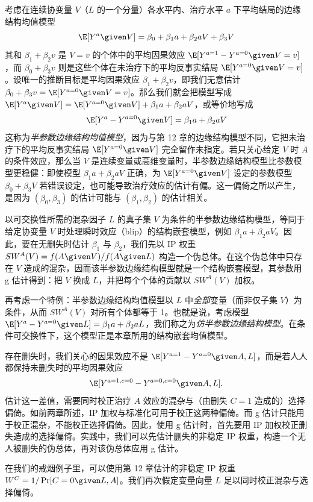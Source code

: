 \begin{finepoint}[边缘结构模型与结构嵌套模型的关系]
考虑在连续协变量 $V$（$L$ 的一个分量）各水平内、治疗水平 $a$ 下平均结局的边缘结构均值模型
\[
\E[Y^a\given V]=\beta_0+\beta_1a+\beta_2aV+\beta_3V
\]
其和 $\beta_1+\beta_2v$ 是 $V=v$ 的个体中的平均因果效应 $\E[Y^{a=1}-Y^{a=0}\given V=v]$，而 $\beta_0+\beta_3v$ 则是这些个体在未治疗下的平均反事实结局 $\E[Y^{a=0}\given V=v]$。设唯一的推断目标是平均因果效应 $\beta_1+\beta_2v$，即我们无意估计 $\beta_0+\beta_3v=\E[Y^{a=0}\given V=v]$。那么我们就会把模型写成 $\E[Y^a\given V]=\E[Y^{a=0}\given V]+\beta_1a+\beta_2aV$，或等价地写成
\[
\E[Y^a-Y^{a=0}\given V]=\beta_1a+\beta_2aV
\]
这称为\emph{半参数边缘结构均值模型}，因为与第 12 章的边缘结构模型不同，它把未治疗下的平均反事实结局 $\E[Y^{a=0}\given V]$ 完全留作未指定。若只关心给定 $V$ 时 $A$ 的条件效应，那么当 $V$ 是连续变量或高维变量时，半参数边缘结构模型比参数模型更稳健：即使模型 $\beta_1a+\beta_2aV$ 正确，为 $\E[Y^{a=0}\given V]$ 设定的参数模型 $\beta_0+\beta_3V$ 若错误设定，也可能导致治疗效应的估计有偏。这一偏倚之所以产生，是因为 $(\beta_0,\beta_3)$ 的估计可能与 $(\beta_1,\beta_2)$ 的估计相关。

以可交换性所需的混杂因子 $L$ 的真子集 $V$ 为条件的半参数边缘结构模型，等同于给定协变量 $V$ 时处理瞬时效应（blip）的结构嵌套模型，例如 $\beta_1a+\beta_2aV$。因此，要在无删失时估计 $\beta_1$ 与 $\beta_2$，我们先以 IP 权重 $SW^A(V)=f(A\given V)/f(A\given L)$ 构造一个伪总体。在这个伪总体中只存在 $V$ 造成的混杂，因而该半参数边缘结构模型就是一个结构嵌套模型，其参数用 g 估计得到：把 $V$ 换成 $L$，并把每个个体的贡献以 $SW^A(V)$ 加权。

再考虑一个特例：半参数边缘结构均值模型以 $L$ 中\emph{全部}变量（而非仅子集 $V$）为条件，从而 $SW^A(V)$ 对所有个体都等于 1。也就是说，考虑模型 $\E[Y^a-Y^{a=0}\given L]=\beta_1a+\beta_2aL$，我们称之为\emph{仿半参数边缘结构模型}。在条件可交换性下，这个模型正是本章所用的结构嵌套均值模型。
\end{finepoint}

存在删失时，我们关心的因果效应不是 $\E[Y^{a=1}-Y^{a=0}\given A,L]$，而是若人人都保持未删失时的平均因果效应
\[
\E[Y^{a=1,c=0}-Y^{a=0,c=0}\given A,L].
\]
估计这一差值，需要同时校正治疗 $A$ 效应的混杂与（由删失 $C=1$ 造成的）选择偏倚。如前两章所述，IP 加权与标准化可用于校正这两种偏倚。而 g 估计只能用于校正混杂，不能校正选择偏倚。因此，使用 g 估计时，首先要用 IP 加权校正删失造成的选择偏倚。实践中，我们可以先估计删失的非稳定 IP 权重，构造一个无人被删失的伪总体，再对该伪总体应用 g 估计。

在我们的戒烟例子里，可以使用第 12 章估计的非稳定 IP 权重 $W^C=1/\Pr[C=0\given L,A]$。我们再次假定变量向量 $L$ 足以同时校正混杂与选择偏倚。


